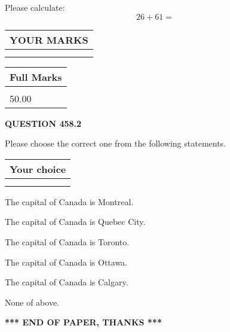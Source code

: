 \documentclass[12pt]{article}
\begin{document}
  
 
Please calculate:
\begin{equation}
26 +  %
61 = \nonumber
\end{equation}
 

 

 
  
\vspace{0.2in}
  
\noindent\begin{tabular}{|l|}
\hline
 YOUR MARKS  \\
\hline
 \\ 
 \\ 
\hline
\end{tabular}
\hspace{0.05in} \begin{tabular}{|l|}
\hline
 Full Marks  \\
\hline
 \\ 
50.00 \\
\hline
\end{tabular}
{\textbf{\Large{QUESTION
458.2 
}}}
  
  
Please choose the correct one from the following statements.
  
  
\noindent\hspace{3.0in} \begin{tabular}{|l|}
\hline
Your choice \\
\hline
 \\ 
 \\ 
\hline
\end{tabular}
  
  
 
 
The capital of Canada is Montreal.
 
 
The capital of Canada is Quebec City.
 
 
The capital of Canada is Toronto.
 
 
The capital of Canada is Ottawa.
 
 
The capital of Canada is Calgary.
 
 
 None of above.
 
 
   
   
 \vspace{0.2in}
 
   
   
   
   
\vspace{1.0in} 
{\textbf{\large{ *** END OF PAPER, THANKS *** }}} 
   
\end{document}
